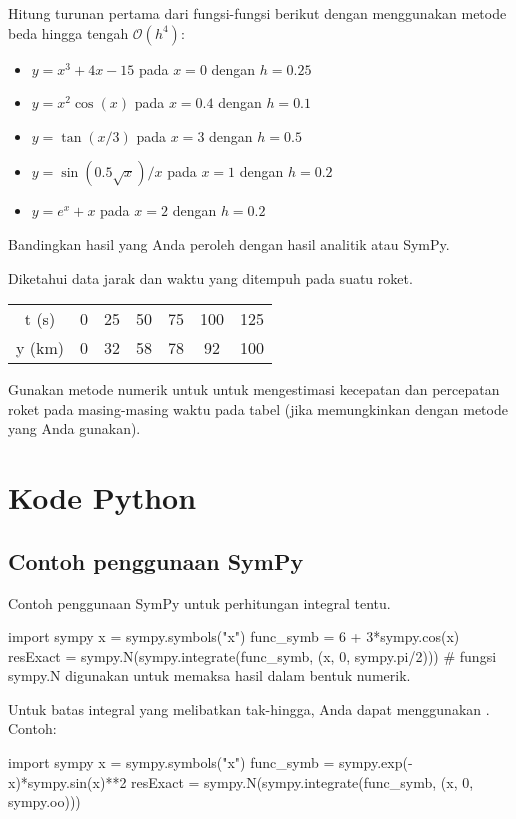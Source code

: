 \begin{soal}
Hitung turunan pertama dari fungsi-fungsi berikut dengan menggunakan metode beda hingga
tengah $\mathcal{O}(h^4)$:
\begin{itemize}
\item $y = x^3 + 4x - 15$ pada $x=0$ dengan $h=0.25$
\item $y = x^2 \cos(x)$ pada $x=0.4$ dengan $h=0.1$
\item $y = \tan(x/3)$ pada $x=3$ dengan $h=0.5$
\item $y = \sin(0.5\sqrt{x})/x$ pada $x=1$ dengan $h=0.2$
\item $y = e^{x} + x$ pada $x=2$ dengan $h=0.2$
\end{itemize}
Bandingkan hasil yang Anda peroleh dengan hasil analitik atau SymPy.
\end{soal}


\begin{soal}
Diketahui data jarak dan waktu yang ditempuh pada suatu roket.

{\centering
\begin{tabular}{|c|cccccc|}
\hline
t (s)  & 0 & 25 & 50 & 75 & 100 & 125 \\
y (km) & 0 & 32 & 58 & 78 &  92 & 100 \\
\hline
\end{tabular}
\par}

Gunakan metode numerik untuk untuk mengestimasi kecepatan dan percepatan roket
pada masing-masing waktu pada tabel (jika memungkinkan dengan metode yang Anda
gunakan).
\end{soal}


\section*{Kode Python}

\subsection*{Contoh penggunaan SymPy}
Contoh penggunaan SymPy untuk perhitungan integral tentu.
\begin{pythoncode}
import sympy
x = sympy.symbols("x")
func_symb = 6 + 3*sympy.cos(x)
resExact = sympy.N(sympy.integrate(func_symb, (x, 0, sympy.pi/2)))
# fungsi sympy.N digunakan untuk memaksa hasil dalam bentuk numerik.
\end{pythoncode}

Untuk batas integral yang melibatkan tak-hingga, Anda dapat menggunakan
. Contoh:
\begin{pythoncode}
import sympy
x = sympy.symbols("x")
func_symb = sympy.exp(-x)*sympy.sin(x)**2
resExact = sympy.N(sympy.integrate(func_symb, (x, 0, sympy.oo)))
\end{pythoncode}

